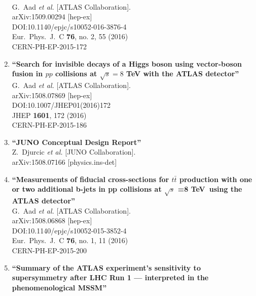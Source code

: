 \documentclass{article}
\begin{document}
\begin{enumerate}
  \\{}G.~Aad {\it et al.} [ATLAS Collaboration].
  \\{}arXiv:1509.00294 [hep-ex]
  \\{}DOI:10.1140/epjc/s10052-016-3876-4
  \\{}Eur.\ Phys.\ J.\ C {\bf 76}, no. 2, 55 (2016)
  \\{}CERN-PH-EP-2015-172
\item%
{\bf ``Search for invisible decays of a Higgs boson using vector-boson fusion in $pp$ collisions at $\sqrt{s}=8$ TeV with the ATLAS detector''}
  \\{}G.~Aad {\it et al.} [ATLAS Collaboration].
  \\{}arXiv:1508.07869 [hep-ex]
  \\{}DOI:10.1007/JHEP01(2016)172
  \\{}JHEP {\bf 1601}, 172 (2016)
  \\{}CERN-PH-EP-2015-186
\item%
{\bf ``JUNO Conceptual Design Report''}
  \\{}Z.~Djurcic {\it et al.} [JUNO Collaboration].
  \\{}arXiv:1508.07166 [physics.ins-det]
\item%
{\bf ``Measurements of fiducial cross-sections for $t\bar{t}$ production with one or two additional b-jets in pp collisions at $\sqrt{s}$ =8 TeV using the ATLAS detector''}
  \\{}G.~Aad {\it et al.} [ATLAS Collaboration].
  \\{}arXiv:1508.06868 [hep-ex]
  \\{}DOI:10.1140/epjc/s10052-015-3852-4
  \\{}Eur.\ Phys.\ J.\ C {\bf 76}, no. 1, 11 (2016)
  \\{}CERN-PH-EP-2015-200
\item%
{\bf ``Summary of the ATLAS experiment’s sensitivity to supersymmetry after LHC Run 1 — interpreted in the phenomenological MSSM''}

\end{enumerate}
\end{document}
